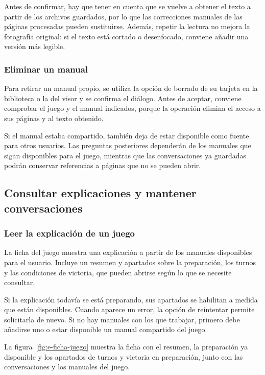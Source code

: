 Antes de confirmar, hay que tener en cuenta que se vuelve a obtener el
texto a partir de los archivos guardados, por lo que las correcciones
manuales de las páginas procesadas pueden sustituirse. Además, repetir la
lectura no mejora la fotografía original: si el texto está cortado o
desenfocado, conviene añadir una versión más legible.

\subsubsection{Eliminar un manual}

Para retirar un manual propio, se utiliza la opción de borrado de su
tarjeta en la biblioteca o la del visor y se confirma el diálogo. Antes de
aceptar, conviene comprobar el juego y el manual indicados, porque la
operación elimina el acceso a sus páginas y al texto obtenido.

Si el manual estaba compartido, también deja de estar disponible como
fuente para otros usuarios. Las preguntas posteriores dependerán de los
manuales que sigan disponibles para el juego, mientras que las
conversaciones ya guardadas podrán conservar referencias a páginas que no
se pueden abrir.


\subsection{Consultar explicaciones y mantener conversaciones}
\label{sec:e-consultas}

\subsubsection{Leer la explicación de un juego}

La ficha del juego muestra una explicación a partir de los manuales
disponibles para el usuario. Incluye un resumen y apartados sobre la
preparación, los turnos y las condiciones de victoria, que pueden abrirse
según lo que se necesite consultar.

Si la explicación todavía se está preparando, sus apartados se habilitan
a medida que están disponibles. Cuando aparece un error, la opción de
reintentar permite solicitarla de nuevo. Si no hay manuales con los que
trabajar, primero debe añadirse uno o estar disponible un manual compartido
del juego.

La figura~\ref{fig:e-ficha-juego} muestra la ficha con el resumen, la
preparación ya disponible y los apartados de turnos y victoria en
preparación, junto con las conversaciones y los manuales del juego.

